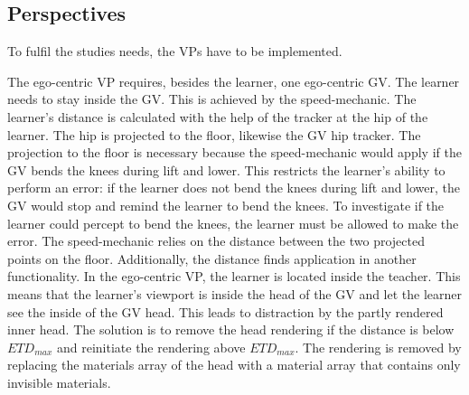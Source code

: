 \subsection{Perspectives}
\label{sec:perspectives}
To fulfil the studies needs, the VPs have to be implemented. 

The ego-centric VP requires, besides the learner, one ego-centric GV. The learner needs to stay inside the GV. This is achieved by the speed-mechanic. The learner's distance is calculated with the help of the tracker at the hip of the learner. The hip is projected to the floor, likewise the GV hip tracker. The projection to the floor is necessary because the speed-mechanic would apply if the GV bends the knees during lift and lower. This restricts the learner's ability to perform an error: if the learner does not bend the knees during lift and lower, the GV would stop and remind the learner to bend the knees. To investigate if the learner could percept to bend the knees, the learner must be allowed to make the error. The speed-mechanic relies on the distance between the two projected points on the floor.
Additionally, the distance finds application in another functionality. In the ego-centric VP, the learner is located inside the teacher. This means that the learner's viewport is inside the head of the GV and let the learner see the inside of the GV head. This leads to distraction by the partly rendered inner head. The solution is to remove the head rendering if the distance is below $ETD_{max}$ and reinitiate the rendering above $ETD_{max}$. The rendering is removed by replacing the materials array of the head with a material array that contains only invisible materials.\\

